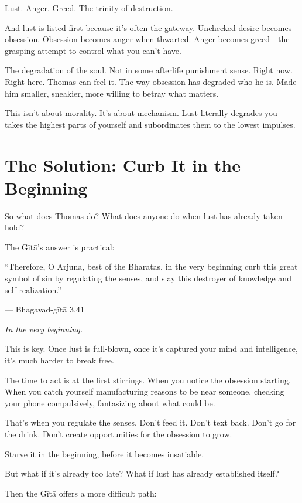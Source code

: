 \documentclass[11pt,twoside]{book}
\begin{document}
Lust. Anger. Greed. The trinity of destruction.

And lust is listed first because it's often the gateway. Unchecked desire becomes obsession. Obsession becomes anger when thwarted. Anger becomes greed—the grasping attempt to control what you can't have.

The degradation of the soul. Not in some afterlife punishment sense. Right now. Right here. Thomas can feel it. The way obsession has degraded who he is. Made him smaller, sneakier, more willing to betray what matters.

This isn't about morality. It's about mechanism. Lust literally degrades you—takes the highest parts of yourself and subordinates them to the lowest impulses.

\section*{The Solution: Curb It in the Beginning}

So what does Thomas do? What does anyone do when lust has already taken hold?

The Gītā's answer is practical:

\begin{pullquote}
``Therefore, O Arjuna, best of the Bharatas, in the very beginning curb this great symbol of sin by regulating the senses, and slay this destroyer of knowledge and self-realization.''

--- Bhagavad-gītā 3.41
\end{pullquote}

\textit{In the very beginning.}

This is key. Once lust is full-blown, once it's captured your mind and intelligence, it's much harder to break free.

The time to act is at the first stirrings. When you notice the obsession starting. When you catch yourself manufacturing reasons to be near someone, checking your phone compulsively, fantasizing about what could be.

That's when you regulate the senses. Don't feed it. Don't text back. Don't go for the drink. Don't create opportunities for the obsession to grow.

Starve it in the beginning, before it becomes insatiable.

But what if it's already too late? What if lust has already established itself?

Then the Gītā offers a more difficult path:
\end{document}
